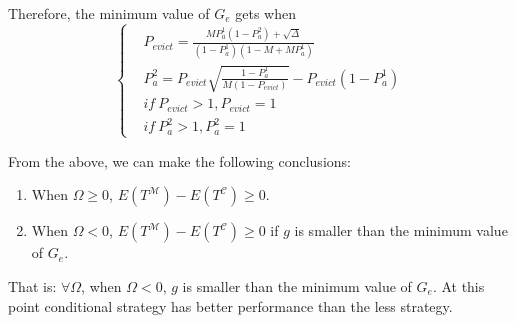 Therefore, the minimum value of $G_e$ gets when
\begin{equation}
\left\{
\begin{split}
&P_{evict} = \frac{MP_{a}^{\mathfrak{1}}(1-P_{a}^{\mathfrak{2}})+\sqrt{\Delta}}{(1-P_{a}^{\mathfrak{1}})(1-M+MP_{a}^{\mathfrak{1}})} \\
&P_{a}^{\mathfrak{2}} = P_{evict}\sqrt{\frac{1-P_{a}^{\mathfrak{1}}}{M(1-P_{evict})}}-P_{evict}(1-P_{a}^{\mathfrak{1}}) \\
& if\  P_{evict} >1, P_{evict} = 1 \\
& if\  P_{a}^{\mathfrak{2}} >1, P_{a}^{\mathfrak{2}} = 1
\end{split}
\right.
\end{equation}

From the above, we can make the following conclusions:
\begin{enumerate}
  \item
  When $\Omega \geq 0$, $E(T^{\mathcal{M}}) - E(T^{\mathcal{C}}) \geq 0$.
  \item
  When $\Omega < 0$, $E(T^{\mathcal{M}}) - E(T^{\mathcal{C}}) \geq 0$ if $g$ is smaller than the minimum value of $G_e$.
\end{enumerate}

That is:
$\forall \Omega$, when  $\Omega < 0$, $g$ is smaller than the minimum value of $G_e$.
At this point conditional {\vwarm} strategy has better performance than the less {\vwarm} strategy.




